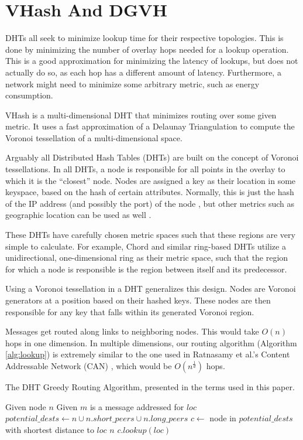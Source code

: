 \chapter{VHash And DGVH}
\label{chapter:dgvh}
DHTs all seek to minimize lookup time for their respective topologies.
This is done by minimizing the number of overlay hops needed for a lookup operation.
This is a good approximation for minimizing the latency of lookups, but does not actually do so, as each hop has a different amount of latency.
Furthermore, a network might need to minimize some arbitrary metric, such as energy consumption.

VHash is a multi-dimensional DHT that minimizes routing over some given metric.
It uses a fast approximation of a Delaunay Triangulation to compute the Voronoi tessellation of a multi-dimensional space.




Arguably all Distributed Hash Tables (DHTs) are built on the concept of Voronoi tessellations.
In all DHTs, a node is responsible for all points in the overlay to which it is the ``closest'' node.
Nodes are assigned a key as their location in some keyspace, based on the hash of certain attributes.
Normally, this is just the hash of the IP address (and possibly the port) of the node \cite{chord} \cite{kademlia} \cite{can} \cite{pastry}, but other metrics such as geographic location can be used as well \cite{ratnasamy2002ght}.

These DHTs have carefully chosen metric spaces such that these regions are very simple to calculate.
For example, Chord \cite{chord} and similar ring-based DHTs \cite{symphony} utilize a unidirectional, one-dimensional ring as their metric space, such that the region for which a node is responsible is the region between itself and its predecessor.

Using a Voronoi tessellation in a DHT generalizes this design.
Nodes are Voronoi generators at a position based on their hashed keys.
These nodes are then responsible for any key that falls within its generated Voronoi region.

Messages get routed along links to neighboring nodes.
This would take $O(n)$ hops in one dimension.
In multiple dimensions, our routing algorithm (Algorithm \ref{alg:lookup}) is extremely similar to the one used in Ratnasamy et al.'s Content Addressable Network (CAN) \cite{can}, which would be $O(n^{\frac{1}{d}})$ hops.


\begin{algorithm}
	\caption[Greedy Routing Algorithm]{The DHT Greedy Routing Algorithm, presented in the terms  used in this paper.}
	\label{alg:lookup}
	\begin{algorithmic}[1]
		\State Given node $n$
		\State Given $m$ is a message addressed for $loc$
		\State $potential\_dests \leftarrow n \cup n.short\_peers \cup n.long\_peers$
		\State $c \leftarrow $ node in $ potential\_dests$ with shortest distance to $loc$
			\State \Return $n$
		\Else
			\State \Return $c.lookup(loc)$
		\EndIf
	\end{algorithmic}
\end{algorithm}


